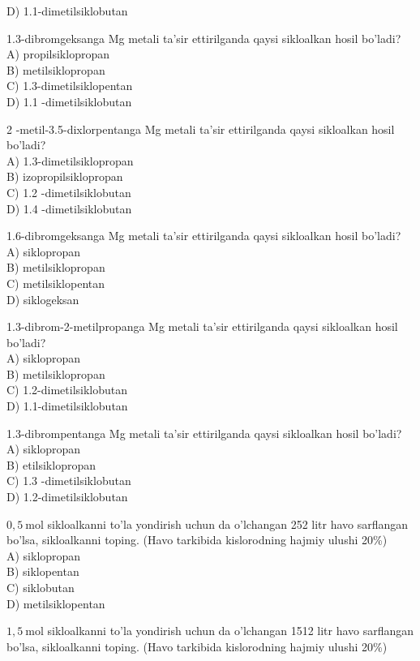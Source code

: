 D) 1.1-dimetilsiklobutan
  \item 1.3-dibromgeksanga Mg metali ta'sir ettirilganda qaysi sikloalkan hosil bo'ladi?\\
A) propilsiklopropan\\
B) metilsiklopropan\\
C) 1.3-dimetilsiklopentan\\
D) 1.1 -dimetilsiklobutan
  \item 2 -metil-3.5-dixlorpentanga Mg metali ta'sir ettirilganda qaysi sikloalkan hosil bo'ladi?\\
A) 1.3-dimetilsiklopropan\\
B) izopropilsiklopropan\\
C) 1.2 -dimetilsiklobutan\\
D) 1.4 -dimetilsiklobutan
  \item 1.6-dibromgeksanga Mg metali ta'sir ettirilganda qaysi sikloalkan hosil bo'ladi?\\
A) siklopropan\\
B) metilsiklopropan\\
C) metilsiklopentan\\
D) siklogeksan
  \item 1.3-dibrom-2-metilpropanga Mg metali ta'sir ettirilganda qaysi sikloalkan hosil bo'ladi?\\
A) siklopropan\\
B) metilsiklopropan\\
C) 1.2-dimetilsiklobutan\\
D) 1.1-dimetilsiklobutan
  \item 1.3-dibrompentanga Mg metali ta'sir ettirilganda qaysi sikloalkan hosil bo'ladi?\\
A) siklopropan\\
B) etilsiklopropan\\
C) 1.3 -dimetilsiklobutan\\
D) 1.2-dimetilsiklobutan
  \item $0,5 \mathrm{~mol}$ sikloalkanni to'la yondirish uchun da o'lchangan 252 litr havo sarflangan bo'lsa, sikloalkanni toping. (Havo tarkibida kislorodning hajmiy ulushi 20\%)\\
A) siklopropan\\
B) siklopentan\\
C) siklobutan\\
D) metilsiklopentan
  \item $1,5 \mathrm{~mol}$ sikloalkanni to'la yondirish uchun da o'lchangan 1512 litr havo sarflangan bo'lsa, sikloalkanni toping. (Havo tarkibida kislorodning hajmiy ulushi 20\%)\\
